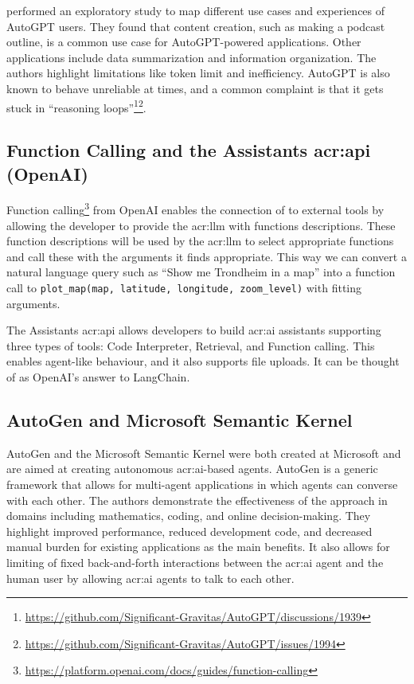 \cite{firatWhatIfGPT42023} performed an exploratory study to map different use cases and experiences of AutoGPT users. They found that content creation, such as making a podcast outline, is a common use case for AutoGPT-powered applications. Other applications include data summarization and information organization. The authors highlight limitations like token limit and inefficiency. AutoGPT is also known to behave unreliable at times, and a common complaint is that it gets stuck in \enquote{reasoning loops}\footnote{\url{https://github.com/Significant-Gravitas/AutoGPT/discussions/1939}}\footnote{\url{https://github.com/Significant-Gravitas/AutoGPT/issues/1994}}.

\subsection[Function Calling and the Assistants API (OpenAI)]{Function Calling and the Assistants \acrshort{acr:api} (OpenAI)}

Function calling\footnote{\url{https://platform.openai.com/docs/guides/function-calling}} from OpenAI enables the connection of  to external tools by allowing the developer to provide the \acrshort{acr:llm} with functions descriptions. These function descriptions will be used by the \acrshort{acr:llm} to select appropriate functions and call these with the arguments it finds appropriate. This way we can convert a natural language query such as \enquote{Show me Trondheim in a map} into a function call to \texttt{plot\_map(map, latitude, longitude, zoom\_level)} with fitting arguments.

The Assistants \acrshort{acr:api} allows developers to build \acrshort{acr:ai} assistants supporting three types of tools: Code Interpreter, Retrieval, and Function calling. This enables agent-like behaviour, and it also supports file uploads. It can be thought of as OpenAI's answer to LangChain.

\subsection{AutoGen and Microsoft Semantic Kernel}\label{subsubsec:microsoft-semantic-kernel}

AutoGen and the Microsoft Semantic Kernel were both created at Microsoft and are aimed at creating autonomous \acrshort{acr:ai}-based agents. AutoGen \citep{wuAutoGenEnablingNextGen2023} is a generic framework that allows for multi-agent applications in which agents can converse with each other. The authors demonstrate the effectiveness of the approach in domains including mathematics, coding, and online decision-making. They highlight improved performance, reduced development code, and decreased manual burden for existing applications as the main benefits. It also allows for limiting of fixed back-and-forth interactions between the \acrshort{acr:ai} agent and the human user by allowing \acrshort{acr:ai} agents to talk to each other.

